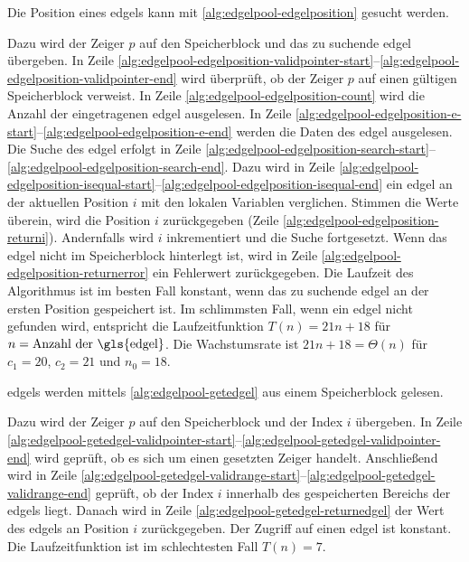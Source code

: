 Die Position eines \glspl{edgel} kann mit \autoref{alg:edgelpool-edgelposition} gesucht werden.

Dazu wird der Zeiger $p$ auf den Speicherblock und das zu suchende \gls{edgel} übergeben. In Zeile
 \ref{alg:edgelpool-edgelposition-validpointer-start}--\ref{alg:edgelpool-edgelposition-validpointer-end} wird
 überprüft, ob der Zeiger $p$ auf einen gültigen Speicherblock verweist. In Zeile
 \ref{alg:edgelpool-edgelposition-count} wird die Anzahl der eingetragenen \gls{edgel} ausgelesen. In Zeile
 \ref{alg:edgelpool-edgelposition-e-start}--\ref{alg:edgelpool-edgelposition-e-end} werden die Daten des \gls{edgel}
 ausgelesen. Die Suche des \gls{edgel} erfolgt in Zeile
 \ref{alg:edgelpool-edgelposition-search-start}--\ref{alg:edgelpool-edgelposition-search-end}. Dazu wird in Zeile
 \ref{alg:edgelpool-edgelposition-isequal-start}--\ref{alg:edgelpool-edgelposition-isequal-end} ein \gls{edgel} an der
 aktuellen Position $i$ mit den lokalen Variablen verglichen. Stimmen die Werte überein, wird die Position $i$
 zurückgegeben (Zeile \ref{alg:edgelpool-edgelposition-returni}). Andernfalls wird $i$ inkrementiert und die Suche
 fortgesetzt. Wenn das \gls{edgel} nicht im Speicherblock hinterlegt ist, wird in Zeile
 \ref{alg:edgelpool-edgelposition-returnerror} ein Fehlerwert zurückgegeben. Die Laufzeit des Algorithmus ist im besten
 Fall konstant, wenn das zu suchende \gls{edgel} an der ersten Position gespeichert ist. Im schlimmsten Fall, wenn ein
 \gls{edgel} nicht gefunden wird, entspricht die Laufzeitfunktion $T(n) = 21n + 18 $ für
 $n = \text{Anzahl der \gls{edgel}}$. Die Wachstumsrate ist $21n + 18 = \Theta(n)$ für $c_{1}=20$, $c_{2}=21$ und
 $n_{0} = 18$.

\glspl{edgel} werden mittels \autoref{alg:edgelpool-getedgel} aus einem Speicherblock gelesen.

Dazu wird der Zeiger $p$ auf den Speicherblock und der Index $i$ übergeben. In Zeile
 \ref{alg:edgelpool-getedgel-validpointer-start}--\ref{alg:edgelpool-getedgel-validpointer-end} wird geprüft, ob es
 sich um einen gesetzten Zeiger handelt. Anschließend wird in Zeile
 \ref{alg:edgelpool-getedgel-validrange-start}--\ref{alg:edgelpool-getedgel-validrange-end} geprüft, ob der Index $i$
 innerhalb des gespeicherten Bereichs der \glspl{edgel} liegt. Danach wird in Zeile
 \ref{alg:edgelpool-getedgel-returnedgel} der Wert des \glspl{edgel} an Position $i$ zurückgegeben. Der Zugriff auf
 einen \gls{edgel} ist konstant. Die Laufzeitfunktion ist im schlechtesten Fall $T(n) = 7$.

